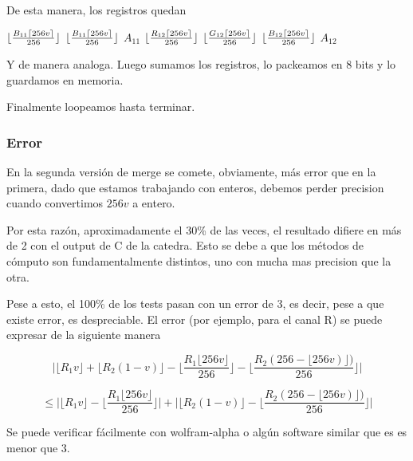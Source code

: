De esta manera, los registros quedan


{$\lfloor\frac{B_{11}\lceil256v\rceil}{256}\rfloor$}
{$\lfloor\frac{B_{11}\lceil256v\rceil}{256}\rfloor$}
{$A_{11}$}
{$\lfloor\frac{R_{12}\lceil256v\rceil}{256}\rfloor$}
{$\lfloor\frac{G_{12}\lceil256v\rceil}{256}\rfloor$}
{$\lfloor\frac{B_{12}\lceil256v\rceil}{256}\rfloor$}
{$A_{12}$}

Y  de manera analoga. Luego sumamos los registros, lo packeamos en 8 bits y lo guardamos en memoria.

Finalmente loopeamos hasta terminar.



\subsubsection*{Error}

En la segunda versión de merge se comete, obviamente, más error que en la primera, dado que estamos trabajando con enteros, debemos perder precision cuando convertimos $256v$ a entero.

Por esta razón, aproximadamente el 30\% de las veces, el resultado difiere en más de 2 con el output de C de la catedra. Esto se debe a que los métodos de cómputo son fundamentalmente distintos, uno con mucha mas precision que la otra.

Pese a esto, el 100\% de los tests pasan con un error de 3, es decir, pese a que existe error, es despreciable. El error (por ejemplo, para el canal R) se puede expresar de la siguiente manera

$$\bigg|\lfloor R_1v\rfloor + \lfloor R_2(1-v) \rfloor
  -\bigg\lfloor \frac{R_1\lfloor 256v \rfloor}{256} \bigg\rfloor 
 -\bigg\lfloor \frac{R_2(256- \lfloor 256v) \rfloor)}{256} \bigg\rfloor\bigg| $$


$$\leq
\bigg|
\lfloor R_1v\rfloor - \bigg\lfloor \frac{R_1\lfloor 256v \rfloor}{256} \bigg\rfloor
\bigg|
+
\bigg|
\lfloor R_2(1-v) \rfloor -\bigg\lfloor \frac{R_2(256- \lfloor 256v) \rfloor)}{256} \bigg\rfloor
\bigg| $$

Se puede verificar fácilmente con wolfram-alpha o algún software similar que es es menor que 3.


